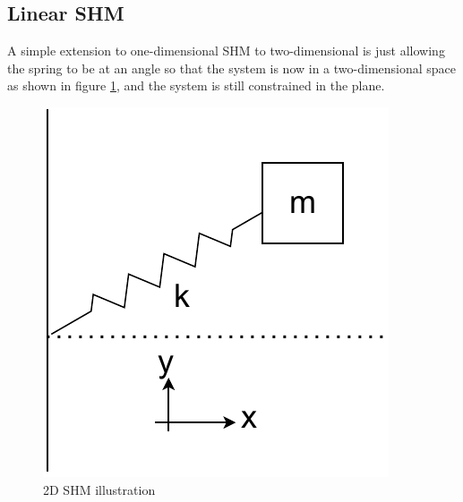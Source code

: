 \documentclass{statsmsc}
\begin{document}
\subsection{Linear SHM}
A simple extension to one-dimensional SHM to two-dimensional is just allowing the spring to be at an angle so that the system is now in a two-dimensional space as shown in figure \ref{fig:shm_2d_diagram}, and the system is still constrained in the plane.

\begin{figure}[H]
        \centering
        \includegraphics[width=0.4\linewidth]{../figures/2dshm.pdf}
        \caption{2D SHM illustration}
        \label{fig:shm_2d_diagram}
\end{figure}
\end{document}
